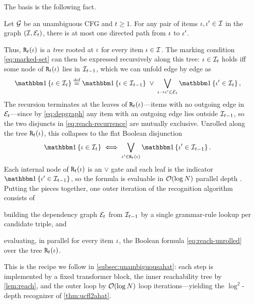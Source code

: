 \documentclass{article}
\begin{document}
The basis is the following fact.
\begin{fact}\label{fact:upprop}
    Let ${{ \mathcal{G}}}$ be an unambiguous CFG and $t \ge 1$. 
    For any pair of items ${{ \iota}}, {{ \iota}}' \in {{\mathcal{I}}}$ in the graph $({{\mathcal{I}}}, {\mathcal{E}}_t)$, there is at most one directed path from ${{ \iota}}$ to ${{ \iota}}'$.
\end{fact}
Thus, ${\mathtt{R}}_t({{ \iota}})$ is a \emph{tree} rooted at ${{ \iota}}$ for every item ${{ \iota}} \in {{\mathcal{I}}}$.
The marking condition \cref{eq:marked-set} can then be expressed recursively along this tree: ${{ \iota}} \in {{\mathcal{I}}}_t$ holds iff some node of ${\mathtt{R}}_t({{ \iota}})$ lies in ${{\mathcal{I}}}_{t-1}$, which we can unfold edge by edge as
\begin{equation}\label{eq:reach-recurrence}
    \ind{\itm \in \items_t} \defeq \ind{\itm \in \items_{t-1}} \;\lor\; \bigvee_{\itm \to \itm' \in \edges_t} \ind{\itm' \in \items_t},
\end{equation}
The recursion terminates at the leaves of ${\mathtt{R}}_t({{ \iota}})$---items with no outgoing edge in ${\mathcal{E}}_t$---since by \cref{eq:depgraph} any item with an outgoing edge lies outside ${{\mathcal{I}}}_{t-1}$, so the two disjuncts in \cref{eq:reach-recurrence} are mutually exclusive. Unrolled along the tree ${\mathtt{R}}_t({{ \iota}})$, this collapses to the flat Boolean disjunction
\begin{equation}\label{eq:reach-unrolled}
    \ind{\itm \in \items_t} \iff \bigvee_{\itm' \in \reachable_t(\itm)} \ind{\itm' \in \items_{t-1}}.
\end{equation}
Each internal node of ${\mathtt{R}}_t({{ \iota}})$ is an $\lor$ gate and each leaf is the indicator $\ind{\itm' \in \items_{t-1}}$, so the formula is evaluable in ${{ \mathcal{O}}}(\log {{ N}})$ parallel depth \citep{rytter-2pda}.
Putting the pieces together, one outer iteration of the recognition algorithm consists of
\begin{enumerate*}[label=\textit{(\arabic*)}]
    \item building the dependency graph ${\mathcal{E}}_t$ from ${{\mathcal{I}}}_{t-1}$ by a single grammar-rule lookup per candidate triple, and 
    \item evaluating, in parallel for every item ${{ \iota}}$, the Boolean formula \cref{eq:reach-unrolled} over the tree ${\mathtt{R}}_t({{ \iota}})$.
\end{enumerate*}
This is the recipe we follow in \cref{subsec:unambiguousahat}: each step is implemented by a fixed transformer block, the inner reachability tree by \cref{lem:reach}, and the outer loop by ${{ \mathcal{O}}}(\log {{ N}})$ loop iterations---yielding the $\log^2$-depth recognizer of \cref{thm:ucfl2ahat}.
\end{document}
